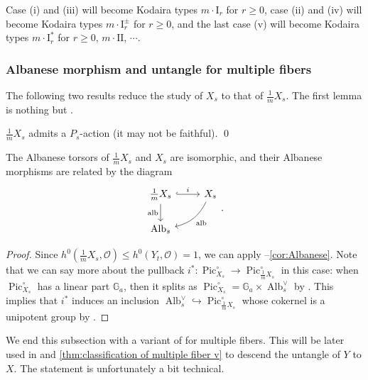 \documentclass[reqno, letterpaper]{amsart}
\numberwithin{equation}{subsection}
\let\to\longrightarrow
\newcommand{\GG}{\mathbb{G}}
\DeclareMathOperator{\Pic}{Pic}
\DeclareMathOperator{\Alb}{Alb}
\DeclareMathOperator{\alb}{alb}
\begin{document}
		Case (i) and (iii) will become Kodaira types $m \cdot \mathrm I_r$ for $r \ge 0$, case (ii) and (iv) will become Kodaira types $m \cdot \mathrm I_r^\pm$ for $r \ge 0$, and the last case (v) will become Kodaira types $m \cdot \mathrm I_r^*$ for $r \ge 0$, $m \cdot \mathrm{II}$, $\cdots$.
		
		
		
		\subsubsection{Albanese morphism and untangle for multiple fibers}
			The following two results reduce the study of $X_s$ to that of $\frac{1}{m} X_s$. The first lemma is nothing but .
			
			\begin{lemma}
				$\frac{1}{m} X_s$ admits a $P_s$-action (it may not be faithful). \qed
			\end{lemma}
			
			\begin{proposition} \label{prop:Albanese of multiple fiber}
				The Albanese torsors of $\frac{1}{m} X_s$ and $X_s$ are isomorphic, and their Albanese morphisms are related by the diagram
				\[\begin{tikzcd}
					\frac{1}{m} X_s \arrow[r, "i", hook] \arrow[d, "\alb"'] & X_s \arrow[dl, bend left=25, "\alb"] \\
					\Alb_s
				\end{tikzcd}.\]
			\end{proposition}
			\begin{proof}
				Since $h^0 (\frac{1}{m}X_s, \mathcal O) \le h^0 (Y_t, \mathcal O) = 1$, we can apply --\ref{cor:Albanese}. Note that we can say more about the pullback $i^* : \Pic^\circ_{X_s} \to \Pic^\circ_{\frac{1}{m}X_s}$ in this case: when $\Pic^\circ_{X_s}$ has a linear part $\GG_a$, then it splits as $\Pic^\circ_{X_s} = \GG_a \times \Alb_s^\vee$ by . This implies that $i^*$ induces an inclusion $\Alb_s^\vee \hookrightarrow \Pic^\circ_{\frac{1}{m} X_s}$ whose cokernel is a unipotent group by .
			\end{proof}
			
			We end this subsection with a variant of  for multiple fibers. This will be later used in  and \ref{thm:classification of multiple fiber v} to descend the untangle of $Y$ to $X$. The statement is unfortunately a bit technical.
			
\end{document}
